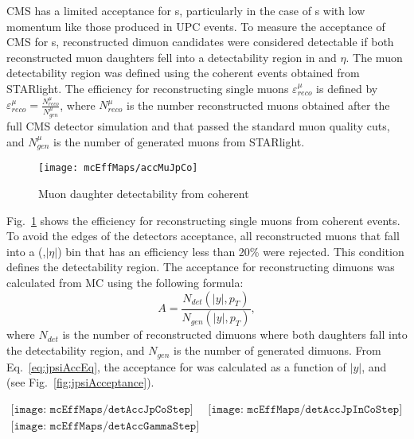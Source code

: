       CMS has a limited acceptance for \JPsi{}s, particularly in the case of 
        \JPsi{}s with low momentum like those produced in UPC events. 
      To measure the acceptance of CMS for \JPsi{}s, reconstructed dimuon 
        candidates were considered detectable if both reconstructed muon 
        daughters fell into a detectability region in \pt{} and $\eta$.
      The muon detectability region was defined using the coherent \JPsi{} 
        events obtained from STARlight.
      The efficiency for reconstructing single muons $\varepsilon^{\mu}_{reco}$ 
        is defined by $\varepsilon^{\mu}_{reco} = \frac{N^{\mu}_{reco}}{N^{\mu}_{gen}}$, 
        where $N^{\mu}_{reco}$ is the number reconstructed muons obtained 
        after the full CMS detector simulation and that passed the standard
        muon quality cuts, and $N^{\mu}_{gen}$ is the number of generated 
        muons from STARlight.
      \begin{figure}[!Hhtb]
        \centering
          \texttt{[image: mcEffMaps/accMuJpCo]} 
        \caption{ Muon daughter detectability from coherent \JPsi{}}
        \label{fig:muonDaughterDet}
      \end{figure}
      Fig.~\ref{fig:muonDaughterDet} shows the efficiency for reconstructing
        single muons from coherent \JPsi{} events.
      To avoid the edges of the detectors acceptance, all reconstructed muons 
        that fall into a (\pt{},$|\eta|$) bin that has an efficiency less 
        than 20\% were rejected.
      This condition defines the detectability region.
      The acceptance for reconstructing dimuons was calculated from MC
        using the following formula:
      \begin{equation}
        A=\frac{N_{det}(|y|,p_{T})}{N_{gen}(|y|,p_{T})},
        \label{eq:jpsiAccEq}
      \end{equation}
        where $N_{det}$ is the number of reconstructed dimuons where both 
        daughters fall into the detectability region, and $N_{gen}$ is the
        number of generated dimuons. 
      From Eq.~\ref{eq:jpsiAccEq}, the acceptance for \JPsi{} was calculated
        as a function of $|y|$, and \pt{} (see Fig.~\ref{fig:jpsiAcceptance}).
        \begin{figure*}[!Hhtb]
          \centering
          $ \begin{array}{cc}
            \texttt{[image: mcEffMaps/detAccJpCoStep]} &
            \texttt{[image: mcEffMaps/detAccJpInCoStep]} \\
            \texttt{[image: mcEffMaps/detAccGammaStep]}
          \end{array} $
          \caption{Dimuon acceptance from coherent \JPsi{} (top left), incoherent 
            J$\psi$ (top right), and photon-photon interactions (lower).}
          \label{fig:jpsiAcceptance}
        \end{figure*}

